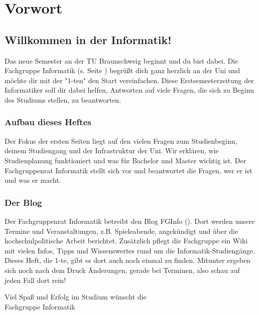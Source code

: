 
\section{Vorwort}
\label{vorwort}
	\begin{multicols}{2}
	\subsection*{Willkommen in der Informatik!}	

	Das neue Semester an der TU Braunschweig beginnt und du bist dabei. Die Fachgruppe Informatik (s. Seite \pageref{fachgruppe}) begrüßt dich ganz herzlich an der Uni und möchte dir mit der "1-ten" den Start vereinfachen. Diese Erstsemesterzeitung der Informatiker soll dir dabei helfen, Antworten auf viele Fragen, die sich zu Beginn des Studiums stellen, zu beantworten.

	\subsubsection*{Aufbau dieses Heftes}
		Der Fokus der ersten Seiten liegt auf den vielen Fragen zum Studienbeginn, deinem Studiengang und der Infrastruktur der Uni. Wir erklären, wie Studienplanung funktioniert und was für Bachelor und Master wichtig ist.
Der Fachgruppenrat Informatik stellt sich vor und beantwortet die Fragen, wer er ist und was er macht. 
\columnbreak
	\subsubsection*{Der Blog}
		Der Fachgruppenrat Informatik betreibt den Blog FGInfo (\fginfoUrl). Dort werden unsere Termine und Veranstaltungen, z.B. Spieleabende, angekündigt und über die hochschulpolitische Arbeit berichtet.
Zusätzlich pflegt die Fachgruppe ein Wiki mit vielen Infos, Tipps und Wissenswertes rund um die Informatik-Studiengänge.
Dieses Heft, die 1-te, gibt es dort auch noch einmal zu finden. Mitunter
ergeben sich noch nach dem Druck Änderungen, gerade bei Terminen, also schau auf jeden Fall dort rein!

	\vspace*{0.5cm}

	Viel Spaß und Erfolg im  Studium wünscht  die\\
	\hspace*{2cm}Fachgruppe Informatik
	\end{multicols}
	\vspace{0.5cm}
